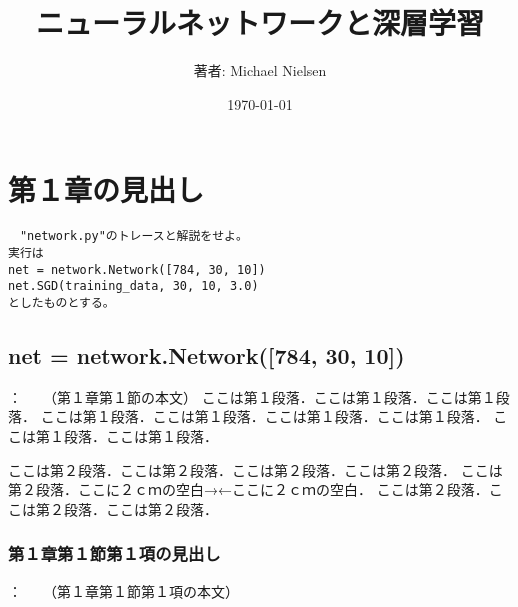 \documentclass[11pt,a4paper]{jreport}
\title{ニューラルネットワークと深層学習}
\author{著者: Michael Nielsen}
\date{\today}
\begin{document}
\maketitle
%
%
\chapter{第１章の見出し}
\begin{verbatim}
　"network.py"のトレースと解説をせよ。
実行は
net = network.Network([784, 30, 10])
net.SGD(training_data, 30, 10, 3.0)
としたものとする。
\end{verbatim}
\section{net = network.Network([784, 30, 10])}
   ：　　（第１章第１節の本文）
   ここは第１段落．ここは第１段落．ここは第１段落．
ここは第１段落．ここは第１段落．ここは第１段落．ここは第１段落．
ここは第１段落．ここは第１段落．

ここは第２段落．ここは第２段落．ここは第２段落．ここは第２段落．
ここは第２段落．ここに２ｃｍの空白→\hspace{2cm}←ここに２ｃｍの空白．
ここは第２段落．ここは第２段落．ここは第２段落．
\subsection{第１章第１節第１項の見出し}
   ：　　（第１章第１節第１項の本文）
\end{document}
